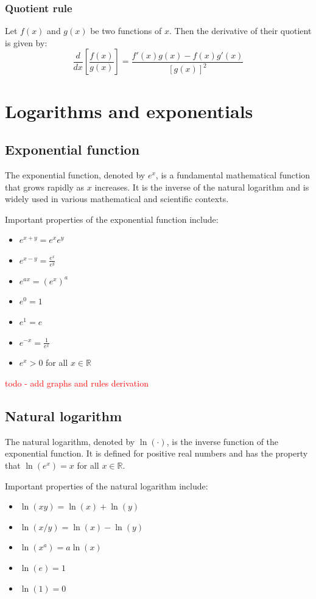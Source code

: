 \documentclass[11pt]{book} %
\begin{document}
\subsubsection{Quotient rule}
Let $f(x)$ and $g(x)$ be two functions of $x$. 
Then the derivative of their quotient is given by:
\begin{equation}
    \frac{d}{dx} \left[\frac{f(x)}{g(x)}\right] = \frac{f'(x)g(x) - f(x)g'(x)}{[g(x)]^2}
\end{equation}


\section{Logarithms and exponentials}



\subsection{Exponential function}
The exponential function, denoted by \(e^x\), is a fundamental mathematical function that grows rapidly as \(x\) increases. 
It is the inverse of the natural logarithm and is widely used in various mathematical and scientific contexts.

Important properties of the exponential function include:
\begin{itemize}
    \item \(e^{x+y} = e^x e^y\)
    \item \(e^{x-y} = \frac{e^x}{e^y}\)
    \item \(e^{ax} = (e^x)^a\)
    \item \(e^0 = 1\)
    \item \(e^1 = e\)
    \item \(e^{-x} = \frac{1}{e^x}\)
    \item \(e^{x} > 0\) for all \(x \in \mathbb{R}\)
\end{itemize}

\textcolor{red}{todo - add graphs and rules derivation}

\subsection{Natural logarithm}
The natural logarithm, denoted by \(\ln(\cdot)\), is the inverse function of the exponential function. 
It is defined for positive real numbers and has the property that \(\ln(e^x) = x\) for all \(x \in \mathbb{R}\).

Important properties of the natural logarithm include:
\begin{itemize}
    \item \(\ln(xy) = \ln(x) + \ln(y)\)
    \item \(\ln(x/y) = \ln(x) - \ln(y)\)
    \item \(\ln(x^a) = a \ln(x)\)
    \item \(\ln(e) = 1\)
    \item \(\ln(1) = 0\)
\end{itemize}
\end{document}
